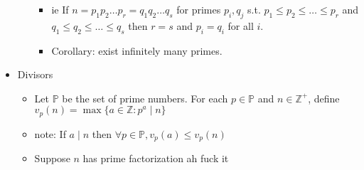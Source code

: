 \documentclass[11pt]{article}
\theoremstyle{definition}
\newcommand{\bb}[1]{\mathbb{#1}}
\begin{document}
\begin{itemize}
\begin{itemize}
        \begin{itemize}
            \item ie If $n=p_1p_2\dots p_r = q_1q_2\dots q_s$ for primes $p_i,q_j$ s.t. $p_1\le p_2\le \dots \le p_r$ and $q_1\le q_2\le \dots \le q_s$ then $r=s$ and $p_i=q_i$ for all $i$.
            \item Corollary: exist infinitely many primes.
        \end{itemize}
    \end{itemize}
    \item Divisors
    \begin{itemize}
        \item Let $\bb{P}$ be the set of prime numbers. For each $p\in \bb{P}$ and $n\in\bb{Z}^+$, define $v_p(n) = \max\{a\in\bb{Z} : p^a\mid n\}$
        \item note: If $a\mid n$ then $\forall p\in\bb{P},v_p(a)\le v_p(n)$
        \item Suppose $n$ has prime factorization ah fuck it
    \end{itemize}
\end{itemize}


\end{document}
